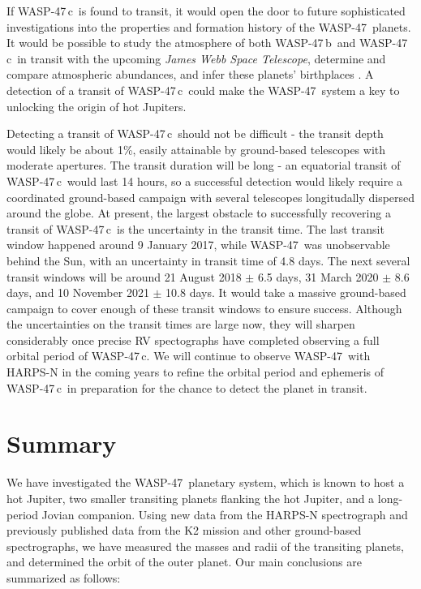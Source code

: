 \documentclass{emulateapj}
\newcommand{\thisstar}{WASP-47}
\newcommand{\thisfirstplanet}{WASP-47\,b}
\newcommand{\thisfourthplanet}{WASP-47\,c}
\begin{document}
If \thisfourthplanet\ is found to transit, it would open the door to future sophisticated investigations into the properties and formation history of the \thisstar\ planets. It would be possible to study the atmosphere of both \thisfirstplanet\ and \thisfourthplanet\ in transit with the upcoming {\em James Webb Space Telescope}, determine and compare atmospheric abundances, and infer these planets' birthplaces \citep{oberg}. A detection of a transit of \thisfourthplanet\ could make the \thisstar\ system a key to unlocking the origin of hot Jupiters. 

Detecting a transit of \thisfourthplanet\ should not be difficult - the transit depth would likely be about 1\%, easily attainable by ground-based telescopes with moderate apertures. The transit duration will be long - an equatorial transit of \thisfourthplanet\ would last 14 hours, so a successful detection would likely require a coordinated ground-based campaign with several telescopes longitudally dispersed around the globe. At present, the largest obstacle to successfully recovering a transit of \thisfourthplanet\ is the uncertainty in the transit time. The last transit window happened around 9 January 2017, while \thisstar\ was unobservable behind the Sun, with an uncertainty in transit time of 4.8 days. The next several transit windows will be around 21 August 2018 $\pm$ 6.5 days, 31 March 2020 $\pm$ 8.6 days, and 10 November 2021 $\pm$ 10.8 days. It would take a massive ground-based campaign to cover enough of these transit windows to ensure success. Although the uncertainties on the transit times are large now, they will sharpen considerably once precise RV spectographs have completed observing a full orbital period of \thisfourthplanet. We will continue to observe \thisstar\ with HARPS-N in the coming years to refine the orbital period and ephemeris of \thisfourthplanet\ in preparation for the chance to detect the planet in transit. 

\section{Summary}
\label{summary} 

We have investigated the \thisstar\ planetary system, which is known to host a hot Jupiter, two smaller transiting planets flanking the hot Jupiter, and a long-period Jovian companion. Using new data from the HARPS-N spectrograph and previously published data from the K2 mission and other ground-based spectrographs, we have measured the masses and radii of the transiting planets, and determined the orbit of the outer planet. Our main conclusions are summarized as follows: 
\end{document}
